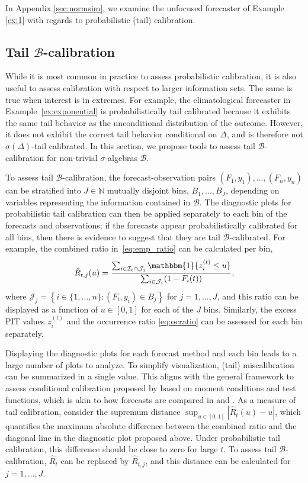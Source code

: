 \documentclass[12pt]{article}
\newcommand{\one}{\mathbbm{1}}
\newcommand{\Bb}{\mathcal{B}}
\newcommand{\Ii}{\mathcal{I}}
\newcommand{\Jj}{\mathcal{J}}
\newcommand{\1}{\mathbf{1}} %
\newcommand{\zit}{z_{i}^{(t)}}
\theoremstyle{definition}
\begin{document}
    In Appendix \ref{sec:normsim}, we examine the unfocused forecaster of Example \ref{ex:1} with regards to probabilistic (tail) calibration.

\subsection{Tail $\Bb$-calibration}\label{sec:btail}

While it is most common in practice to assess probabilistic calibration, it is also useful to assess calibration with respect to larger information sets. The same is true when interest is in extremes. For example, the climatological forecaster in Example~\ref{ex:exponential} is probabilistically tail calibrated because it exhibits the same tail behavior as the unconditional distribution of the outcome. However, it does not exhibit the correct tail behavior conditional on $\Delta$, and is therefore not $\sigma(\Delta)$-tail calibrated. In this section, we propose tools to assess tail $\Bb$-calibration for non-trivial $\sigma$-algebras $\Bb$.

To assess tail $\Bb$-calibration, the forecast-observation pairs $(F_{1}, y_{1}), \dots, (F_{n}, y_{n})$ can be stratified into $J \in \mathbb{N}$ mutually disjoint bins, $B_{1}, \dots, B_{J}$, depending on variables representing the information contained in $\Bb$. The diagnostic plots for probabilistic tail calibration can then be applied separately to each bin of the forecasts and observations; if the forecasts appear probabilistically calibrated for all bins, then there is evidence to suggest that they are tail $\Bb$-calibrated. For example, the combined ratio in~\eqref{eq:emp_ratio} can be calculated per bin,
\begin{equation}
\label{eq:Rtj}
    \hat{R}_{t,j}(u) = \frac{\sum_{i \in \Ii_{t} \cap \Jj_{j}} \one\{\zit \leq u \}}{ \sum_{i \in \Jj_{j}} (1 - F_{i}(t))},
\end{equation}
where $\Jj_{j} = \left\{i \in \{1, \dots, n\} : (F_{i}, y_{i}) \in B_{j} \right\}$ for $j= 1, \dots, J$, and this ratio can be displayed as a function of $u \in [0, 1]$ for each of the $J$ bins. Similarly, the excess PIT values $\zit$ and the occurrence ratio \eqref{eq:ocratio} can be assessed for each bin separately.

Displaying the diagnostic plots for each forecast method and each bin leads to a large number of plots to analyze. To simplify visualization, (tail) miscalibration can be summarized in a single value. This aligns with the general framework to assess conditional calibration proposed by \cite{Tsyplakov2011} based on moment conditions and test functions, which is akin to how forecasts are compared in \cite{GiacominiWhite2006} and \cite{NoldeZiegel2017}.
As a measure of tail calibration, consider the supremum distance $\sup_{u \in [0, 1]} | \hat{R}_{t} (u) - u |$, which quantifies the maximum absolute difference between the combined ratio and the diagonal line in the diagnostic plot proposed above. Under probabilistic tail calibration, this difference should be close to zero for large $t$. To assess tail $\Bb$-calibration, $\hat{R}_{t}$ can be replaced by $\hat{R}_{t,j}$, and this distance can be calculated for $j=1, \dots, J$.
\end{document}
